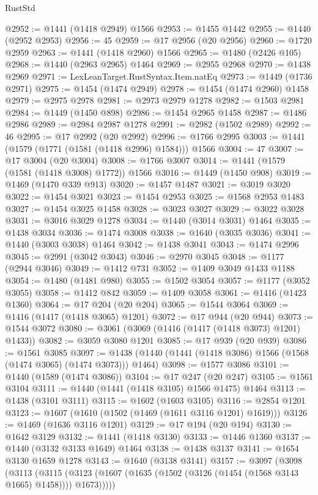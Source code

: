 \begin{lexlean}{RustStd}
\begin{coremodule}
@2952 := @1441 (@1418 @2949) @1566
@2953 := @1455 @1442
@2955 := @1440 (@2952 @2953)
@2956 := 45
@2959 := @17 @2956 (@20 @2956)
@2960 := @1720 @2959
@2963 := @1441 (@1418 @2960) @1566
@2965 := @1480 (@2426 @105)
@2968 := @1440 (@2963 @2965) @1464
@2969 := @2955 @2968
@2970 := @1438 @2969
@2971 := LexLeanTarget.RustSyntax.Item.natEq
@2973 := @1449 (@1736 @2971)
@2975 := @1454 (@1474 @2949)
@2978 := @1454 (@1474 @2960) @1458
@2979 := @2975 @2978
@2981 := @2973 @2979 @1278
@2982 := @1503 @2981
@2984 := @1449 (@1450 @898)
@2986 := @1454 @2965 @1458
@2987 := @1486 @2986
@2989 := @2984 @2987 @1278
@2991 := @2982 (@1502 @2989)
@2992 := 46
@2995 := @17 @2992 (@20 @2992)
@2996 := @1766 @2995
@3003 := @1441 (@1579 (@1771 (@1581 (@1418 @2996) @1584))) @1566
@3004 := 47
@3007 := @17 @3004 (@20 @3004)
@3008 := @1766 @3007
@3014 := @1441 (@1579 (@1581 (@1418 @3008) @1772)) @1566
@3016 := @1449 (@1450 @908)
@3019 := @1469 (@1470 @339 @913)
@3020 := @1457 @1487
@3021 := @3019 @3020
@3022 := @1454 @3021
@3023 := @1454 @2953
@3025 := @1568 @2953 @1483
@3027 := @1454 @3025 @1458
@3028 := @3023 @3027
@3029 := @3022 @3028
@3031 := @3016 @3029 @1278
@3034 := @1440 (@3014 @3031) @1464
@3035 := @1438 @3034
@3036 := @1474 @3008
@3038 := @1640 (@3035 @3036)
@3041 := @1440 (@3003 @3038) @1464
@3042 := @1438 @3041
@3043 := @1474 @2996
@3045 := @2991 (@3042 @3043)
@3046 := @2970 @3045
@3048 := @1177 (@2944 @3046)
@3049 := @1412 @731
@3052 := @1409 @3049 @1433 @1188
@3054 := @1480 (@1481 @980)
@3055 := @1502 @3054
@3057 := @1177 (@3052 @3055)
@3058 := @1412 @842
@3059 := @1409 @3058
@3061 := @1416 (@1423 @1360)
@3064 := @17 @204 (@20 @204)
@3065 := @1544 @3064
@3069 := @1416 (@1417 (@1418 @3065) @1201)
@3072 := @17 @944 (@20 @944)
@3073 := @1544 @3072
@3080 := @3061 (@3069 (@1416 (@1417 (@1418 @3073) @1201) @1433))
@3082 := @3059 @3080 @1201
@3085 := @17 @939 (@20 @939)
@3086 := @1561 @3085
@3097 := @1438 (@1440 (@1441 (@1418 @3086) @1566 (@1568 (@1474 @3065) (@1474 @3073))) @1464)
@3098 := @1577 @3086
@3101 := @1440 (@1589 (@1474 @3086))
@3104 := @17 @247 (@20 @247)
@3105 := @1561 @3104
@3111 := @1440 (@1441 (@1418 @3105) @1566 @1475) @1464
@3113 := @1438 (@3101 @3111)
@3115 := @1602 (@1603 @3105)
@3116 := @2854 @1201
@3123 := @1607 (@1610 (@1502 (@1469 (@1611 @3116 @1201) @1619)))
@3126 := @1469 (@1636 @3116 @1201)
@3129 := @17 @194 (@20 @194)
@3130 := @1642 @3129
@3132 := @1441 (@1418 @3130)
@3133 := @1446 @1360
@3137 := @1440 (@3132 @3133 @1649) @1464
@3138 := @1438 @3137
@3141 := @1654 @3130 @1659 @1278
@3143 := @1640 (@3138 @3141)
@3157 := @3097
    (@3098
      (@3113
        (@3115 (@3123 (@1607 (@1635 (@1502 (@3126 (@1454 (@1568 @3143 @1665) @1458)))) @1673)))))

\end{coremodule}
\end{lexlean}

